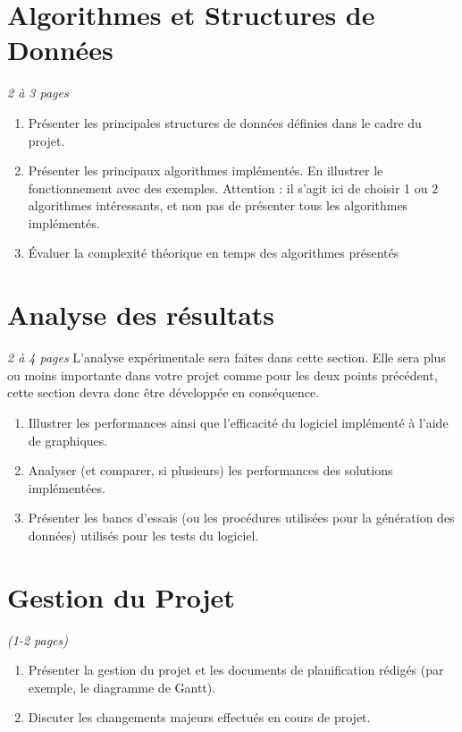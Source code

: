 \documentclass[a4paper]{article} %
\begin{document}
\section{Algorithmes et Structures de Données}
\emph{2 à 3 pages}
\begin{enumerate}%
\item 	Présenter les principales structures de données définies dans le cadre du projet.
\item 	Présenter les principaux algorithmes implémentés. En illustrer le fonctionnement avec des exemples. Attention : il s'agit ici de choisir 1 ou 2 algorithmes intéressants, et non pas de présenter tous les algorithmes implémentés.
\item 	Évaluer la complexité théorique en temps des algorithmes présentés
\end{enumerate}

\section{Analyse des résultats }
\emph{2 à 4 pages}
L'analyse expérimentale sera faites dans cette section.   Elle sera plus ou moins importante dans votre projet comme pour les deux points précédent, cette section devra donc être développée en conséquence.

\begin{enumerate}%
\item 	Illustrer les performances ainsi que l'efficacité du logiciel implémenté à l'aide de graphiques.
\item Analyser (et comparer, si plusieurs) les performances des solutions implémentées.
\item	Présenter les bancs d'essais (ou les procédures utilisées pour la génération des données) utilisés pour les tests du logiciel.
\end{enumerate}

\section{Gestion du Projet}
\emph{ (1-2 pages)}
\begin{enumerate}%
\item 	Présenter la gestion du projet et les documents de planification rédigés (par exemple, le diagramme de Gantt).
\item	Discuter les changements majeurs effectués en cours de projet. 
\end{enumerate}
\end{document}
